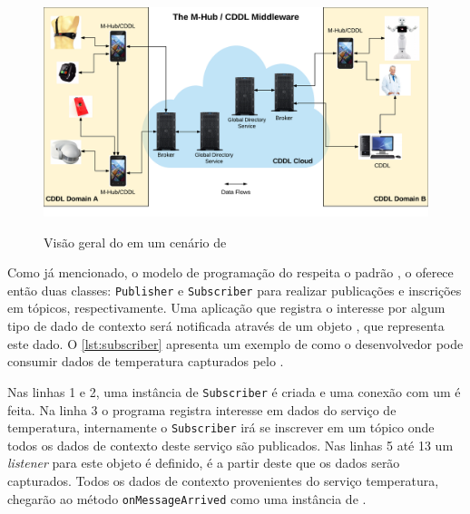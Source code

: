 \begin{figure}[htb]
	\centering
	\caption{Visão geral do \mhubcddl em um cenário de \iomt}
	\includegraphics[width=.85\linewidth]{img/general-vision-cddl.png}
	\label{fig:general-vision-cddl}
\end{figure}


Como já mencionado, o modelo de programação do \cddl respeita o padrão \pubsub, o \middleware oferece então duas classes: \texttt{Publisher} e \texttt{Subscriber} para realizar publicações e inscrições em tópicos, respectivamente.
Uma aplicação que registra o interesse por algum tipo de dado de contexto será notificada através de um objeto \msg, que representa este dado.
O \autoref{lst:subscriber} apresenta um exemplo de como o desenvolvedor pode consumir dados de temperatura capturados pelo \middleware.



Nas linhas 1 e 2, uma instância de \texttt{Subscriber} é criada e uma conexão com um \broker é feita.
Na linha 3 o programa registra interesse em dados do serviço de temperatura, internamente o \texttt{Subscriber} irá se inscrever em um tópico onde todos os dados de contexto deste serviço são publicados.
Nas linhas 5 até 13 um \textit{listener} para este objeto é definido, é a partir deste que os dados serão capturados.
Todos os dados de contexto provenientes do serviço temperatura, chegarão ao método \texttt{onMessageArrived} como uma instância de \msg.

